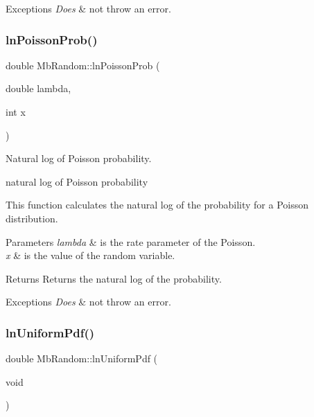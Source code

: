 \begin{DoxyExceptions}{Exceptions}
{\em Does} & not throw an error. \\
\hline
\end{DoxyExceptions}
\mbox{\label{class_mb_random_a9d842b9c60ccd77094cfe97b53fd205c}} 
\subsubsection{\texorpdfstring{lnPoissonProb()}{lnPoissonProb()}}
{\footnotesize\ttfamily double Mb\+Random\+::ln\+Poisson\+Prob (\begin{DoxyParamCaption}\item[{double}]{lambda,  }\item[{int}]{x }\end{DoxyParamCaption})\hspace{0.3cm}{\ttfamily [inline]}}



Natural log of Poisson probability. 

natural log of Poisson probability

This function calculates the natural log of the probability for a Poisson distribution.


\begin{DoxyParams}{Parameters}
{\em lambda} & is the rate parameter of the Poisson. \\
\hline
{\em x} & is the value of the random variable. \\
\hline
\end{DoxyParams}
\begin{DoxyReturn}{Returns}
Returns the natural log of the probability. 
\end{DoxyReturn}

\begin{DoxyExceptions}{Exceptions}
{\em Does} & not throw an error. \\
\hline
\end{DoxyExceptions}
\mbox{\label{class_mb_random_a586a679287cdba3195ee0620d6cb15f8}} 
\subsubsection{\texorpdfstring{lnUniformPdf()}{lnUniformPdf()}\hspace{0.1cm}{\footnotesize\ttfamily [1/2]}}
{\footnotesize\ttfamily double Mb\+Random\+::ln\+Uniform\+Pdf (\begin{DoxyParamCaption}\item[{void}]{ }\end{DoxyParamCaption})\hspace{0.3cm}{\ttfamily [inline]}}



